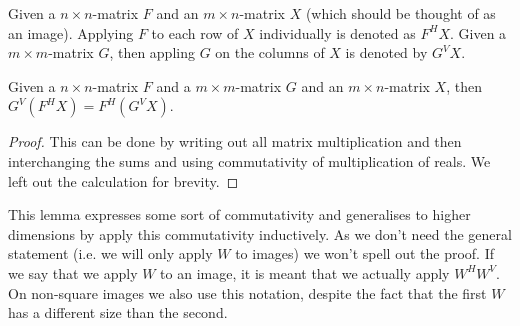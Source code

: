 \begin{notation}
	Given a $n \times n$-matrix $F$ and an $m \times n$-matrix $X$ (which should be thought of as an image). Applying $F$ to each row of $X$ individually is denoted as $F^{H} X$.
	Given a $m \times m$-matrix $G$, then appling $G$ on the columns of $X$ is denoted by $G^{V} X$.
\end{notation}
\begin{lemma}
	Given a $n \times n$-matrix $F$ and a $m \times m$-matrix $G$ and an $m \times n$-matrix $X$, then $G^{V}(F^{H} X) = F^{H}(G^{V} X)$.
\end{lemma}
\begin{proof}
	This can be done by writing out all matrix multiplication and then interchanging the sums and using commutativity of multiplication of reals. We left out the calculation for brevity.
\end{proof}

This lemma expresses some sort of commutativity and generalises to higher dimensions by apply this commutativity inductively. As we don't need the general statement (i.e. we will only apply $W$ to images) we won't spell out the proof. If we say that we apply $W$ to an image, it is meant that we actually apply $W^{H} W^{V}$. On non-square images we also use this notation, despite the fact that the first $W$ has a different size than the second.
